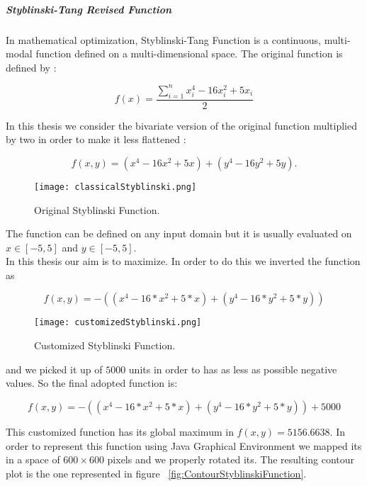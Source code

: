\subparagraph{Styblinski-Tang Revised Function} In mathematical optimization, Styblinski-Tang Function is a continuous, multi-modal function defined on a multi-dimensional space. The original function is defined by :

\begin{equation}
	f(x) = \dfrac{\sum_{i=1}^{n} x_{i}^4 -16x_{i}^2 +5x_{i}}{2}
\end{equation}

In this thesis we consider the bivariate version of the original function multiplied by two in order to make it less flattened :

\begin{equation}
f(x, y) = (x^4 - 16x^2 + 5x) + (y^4 - 16y^2 + 5y).
\end{equation}

\begin{figure}[h!]
	\centering
	\texttt{[image: classicalStyblinski.png]}
	\caption{Original Styblinski Function.}
	\label{fig:OriginalStyblinskiFunction}
\end{figure}

The function can be defined on any input domain but it is usually evaluated on $x \in [-5, 5]$ and $y \in [-5, 5]$. \\

In this thesis our aim is to maximize. In order to do this we inverted the function as

\begin{equation}
f(x, y) = -((x^4 - 16 * x^2 + 5 * x) + (y^4 - 16 * y^2 + 5 * y))
\end{equation}

\begin{figure}[h!]
	\centering
	\texttt{[image: customizedStyblinski.png]}
	\caption{Customized Styblinski Function.}
	\label{fig:CustomizedStyblinskiFunction}
\end{figure}

and we picked it up of $5000$ units in order to has as less as possible negative values. So the final adopted function is: 

\begin{equation}
f(x, y) = -((x^4 - 16 * x^2 + 5 * x) + (y^4 - 16 * y^2 + 5 * y)) + 5000
\end{equation}

This customized function has its global maximum in $f(x, y) = 5156.6638$. In order to represent this function using Java Graphical Environment we mapped its in a space of $600 \times 600$ pixels and we properly rotated its. The resulting contour plot is the one represented in figure ~\ref{fig:ContourStyblinskiFunction}.

